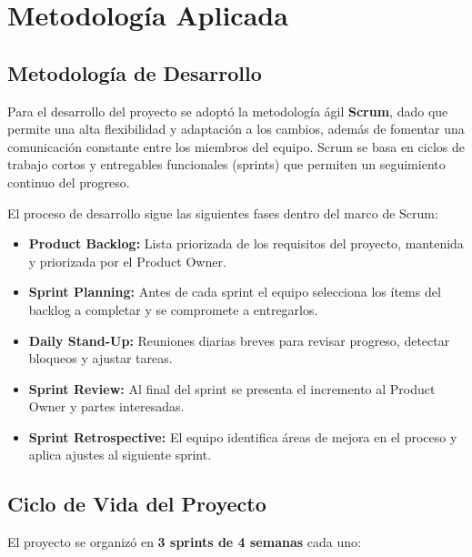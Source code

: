\chapter{Metodología Aplicada}

\section{Metodología de Desarrollo}

Para el desarrollo del proyecto se adoptó la metodología ágil \textbf{Scrum},
dado que permite una alta flexibilidad y adaptación a los cambios, además de
fomentar una comunicación constante entre los miembros del equipo. Scrum se
basa en ciclos de trabajo cortos y entregables funcionales (sprints) que
permiten un seguimiento continuo del progreso.

El proceso de desarrollo sigue las siguientes fases dentro del marco de Scrum:

\begin{itemize}[leftmargin=1.5em]
  \item \textbf{Product Backlog:} Lista priorizada de los requisitos del
        proyecto, mantenida y priorizada por el Product Owner.
  \item \textbf{Sprint Planning:} Antes de cada sprint el equipo selecciona
        los ítems del backlog a completar y se compromete a entregarlos.
  \item \textbf{Daily Stand-Up:} Reuniones diarias breves para revisar
        progreso, detectar bloqueos y ajustar tareas.
  \item \textbf{Sprint Review:} Al final del sprint se presenta el incremento
        al Product Owner y partes interesadas.
  \item \textbf{Sprint Retrospective:} El equipo identifica áreas de mejora
        en el proceso y aplica ajustes al siguiente sprint.
\end{itemize}

\section{Ciclo de Vida del Proyecto}

El proyecto se organizó en \textbf{3 sprints de 4 semanas} cada uno:

